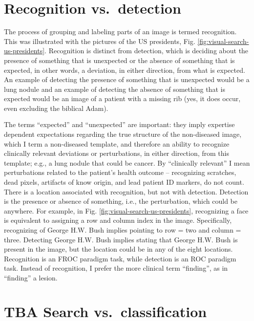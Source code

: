 \documentclass[
]{book}
\begin{document}
\hypertarget{visual-search-recognition-detection}{%
\section{Recognition vs.~detection}\label{visual-search-recognition-detection}}

The process of grouping and labeling parts of an image is termed recognition. This was illustrated with the pictures of the US presidents, Fig. \ref{fig:visual-search-us-presidents}. Recognition is distinct from detection, which is deciding about the presence of something that is unexpected or the absence of something that is expected, in other words, a deviation, in either direction, from what is expected. An example of detecting the presence of something that is unexpected would be a lung nodule and an example of detecting the absence of something that is expected would be an image of a patient with a missing rib (yes, it does occur, even excluding the biblical Adam).

The terms ``expected'' and ``unexpected'' are important: they imply expertise dependent expectations regarding the true structure of the non-diseased image, which I term a non-diseased template, and therefore an ability to recognize clinically relevant deviations or perturbations, in either direction, from this template; e.g., a lung nodule that could be cancer. By ``clinically relevant'' I mean perturbations related to the patient's health outcome -- recognizing scratches, dead pixels, artifacts of know origin, and lead patient ID markers, do not count. There is a location associated with recognition, but not with detection. Detection is the presence or absence of something, i.e., the perturbation, which could be anywhere. For example, in Fig. \ref{fig:visual-search-us-presidents}, recognizing a face is equivalent to assigning a row and column index in the image. Specifically, recognizing of George H.W. Bush implies pointing to row = two and column = three. Detecting George H.W. Bush implies stating that George H.W. Bush is present in the image, but the location could be in any of the eight locations. Recognition is an FROC paradigm task, while detection is an ROC paradigm task. Instead of recognition, I prefer the more clinical term ``finding'', as in ``finding'' a lesion.

\hypertarget{visual-search-search-classification}{%
\section{TBA Search vs.~classification}\label{visual-search-search-classification}}
\end{document}
